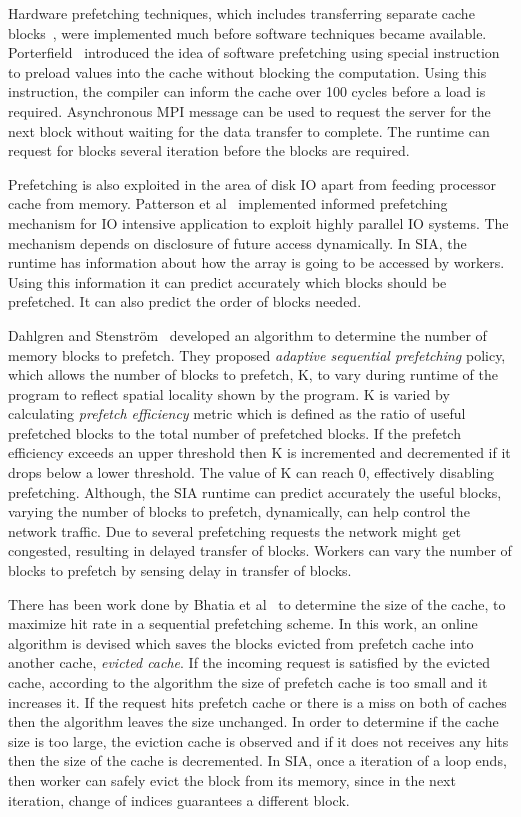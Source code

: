 Hardware prefetching techniques, which includes transferring separate
cache blocks~\cite{Smith1978}, were implemented much before software techniques became
available. Porterfield~\cite{Porterfield1989} introduced the idea of software prefetching
using special instruction to preload values into the cache without blocking the
computation. Using this instruction, the compiler can inform the cache over 100
cycles before a load is required. Asynchronous MPI message can be used to request
the server for the next block without waiting for the data transfer to complete. The runtime can
request for blocks several iteration before the blocks are required.

Prefetching is also exploited in the area of disk IO apart from feeding processor cache
from memory. Patterson et al~\cite{Patterson1994} implemented informed prefetching
mechanism for IO intensive application to exploit highly parallel IO systems. The
mechanism depends on disclosure of future access dynamically. In SIA, the runtime
has information about how the array is going to be accessed by workers. Using this
information it can predict accurately which blocks should be prefetched. It can
also predict the order of blocks needed.

Dahlgren and Stenström~\cite{Dahlgren1993} developed an algorithm to determine the
number of memory blocks to prefetch. They proposed
\textit{adaptive sequential prefetching} policy, which allows the number of blocks
to prefetch, K, to vary during runtime of the program to reflect spatial locality
shown by the program. K is varied by calculating \textit{prefetch efficiency} metric
which is defined as the ratio of useful prefetched blocks to the total number of
prefetched blocks. If the prefetch efficiency exceeds an upper threshold then K is
incremented and decremented if it drops below a lower threshold. The value of K
can reach 0, effectively disabling prefetching. Although, the SIA runtime can
predict accurately the useful blocks, varying the number of blocks to prefetch, dynamically,
can help control the network traffic. Due to several prefetching requests
the network might get congested, resulting in delayed transfer of blocks. Workers
can vary the number of blocks to prefetch by sensing delay in transfer of blocks.

There has been work done by Bhatia et al~\cite{Bhatia2010} to determine the size of
the cache, to maximize hit rate in a sequential prefetching scheme. In this work, an
online algorithm is devised which saves the blocks evicted from prefetch cache
into another cache, \textit{evicted cache}. If the incoming request is satisfied
by the evicted cache, according to the algorithm the size of prefetch cache is too
small and it increases it. If the request hits prefetch cache or there is a miss
on both of caches then the algorithm leaves the size unchanged. In order to determine if
the cache size is too large, the eviction cache is observed and if it does not
receives any hits then the size of the cache is decremented. In SIA, once a
iteration of a loop ends, then worker can safely evict the block from its memory,
since in the next iteration, change of indices guarantees a different block.

